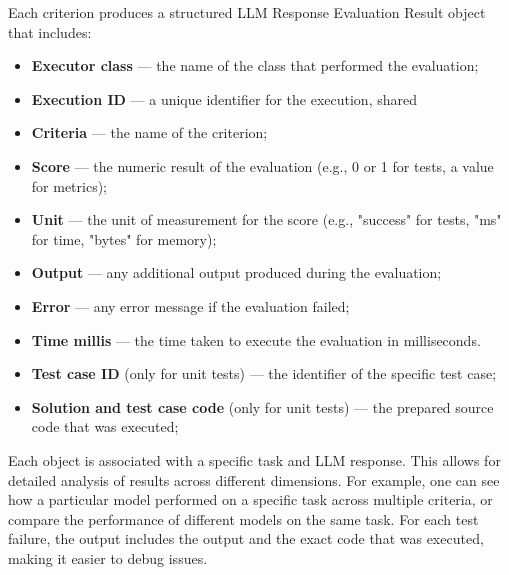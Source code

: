 Each criterion produces a structured LLM Response Evaluation Result object that includes:
\begin{itemize}
    \item \textbf{Executor class} --- the name of the class that performed the evaluation;
    \item \textbf{Execution ID} --- a unique identifier for the execution, shared
    \item \textbf{Criteria} --- the name of the criterion;
    \item \textbf{Score} --- the numeric result of the evaluation (e.g., 0 or 1 for tests, a value for metrics);
    \item \textbf{Unit} --- the unit of measurement for the score (e.g., "success" for tests, "ms" for time, "bytes" for memory);
    \item \textbf{Output} --- any additional output produced during the evaluation;
    \item \textbf{Error} --- any error message if the evaluation failed;
    \item \textbf{Time millis} --- the time taken to execute the evaluation in milliseconds.
    \item \textbf{Test case ID} (only for unit tests) --- the identifier of the specific test case;
    \item \textbf{Solution and test case code} (only for unit tests) --- the prepared source code that was executed;
\end{itemize}

Each object is associated with a specific task and LLM response.
This allows for detailed analysis of results across different dimensions.
For example, one can see how a particular model performed on a specific task across multiple criteria, or compare the performance of different models on the same task.
For each test failure, the output includes the output and the exact code that was executed, making it easier to debug issues.


